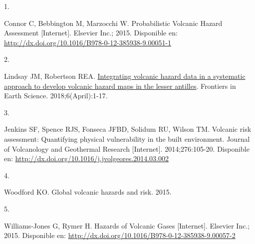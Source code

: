 \documentclass[
  spanish,
  letterpaper,
]{book}
\newlength{\cslhangindent}
\newlength{\csllabelwidth}
\newenvironment{CSLReferences}[2] %
 {\begin{list}{}{%
  \setlength{\itemindent}{0pt}
  \setlength{\leftmargin}{0pt}
  \setlength{\parsep}{0pt}
  \ifodd #1
   \setlength{\leftmargin}{\cslhangindent}
   \setlength{\itemindent}{-1\cslhangindent}
  \fi
  \setlength{\itemsep}{#2\baselineskip}}}
 {\end{list}}
\newcommand{\CSLLeftMargin}[1]{\parbox[t]{\csllabelwidth}{\strut#1\strut}}
\newcommand{\CSLRightInline}[1]{\parbox[t]{\linewidth - \csllabelwidth}{\strut#1\strut}}
\begin{document}
\label{refs}
\begin{CSLReferences}{0}{1}
\CSLLeftMargin{1. }%
\CSLRightInline{Connor C, Bebbington M, Marzocchi W. Probabilistic
Volcanic Hazard Assessment {[}Internet{]}. Elsevier Inc.; 2015.
Disponible en:
\url{http://dx.doi.org/10.1016/B978-0-12-385938-9.00051-1}}

\CSLLeftMargin{2. }%
\CSLRightInline{Lindsay JM, Robertson REA.
\href{https://doi.org/10.3389/feart.2018.00042}{Integrating volcanic
hazard data in a systematic approach to develop volcanic hazard maps in
the lesser antilles}. Frontiers in Earth Science. 2018;6(April):1-17. }

\CSLLeftMargin{3. }%
\CSLRightInline{Jenkins SF, Spence RJS, Fonseca JFBD, Solidum RU, Wilson
TM. Volcanic risk assessment: Quantifying physical vulnerability in the
built environment. Journal of Volcanology and Geothermal Research
{[}Internet{]}. 2014;276:105-20. Disponible en:
\url{http://dx.doi.org/10.1016/j.jvolgeores.2014.03.002}}

\CSLLeftMargin{4. }%
\CSLRightInline{Woodford KO. Global volcanic hazards and risk. 2015. }

\CSLLeftMargin{5. }%
\CSLRightInline{Williams-Jones G, Rymer H. Hazards of Volcanic Gases
{[}Internet{]}. Elsevier Inc.; 2015. Disponible en:
\url{http://dx.doi.org/10.1016/B978-0-12-385938-9.00057-2}}

\end{CSLReferences}


\backmatter
\end{document}
